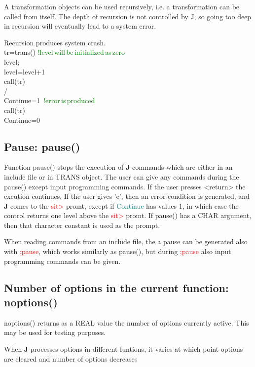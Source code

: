 \begin{note}
A transformation objects can be used recursively, i.e. a transformation can be called from
itself. The depth of recursion is not controlled by J, so going too deep in recursion will
eventually lead to a system error.
\end{note}
\begin{example}[recursion]Recursion produces system crash.\\
\label{recursion}
tr=\textcolor{VioletRed}{trans}() \textcolor{green}{!level\,will\,be\,initialized\,as\,zero}\\
level;\\
level=level+1\\
\textcolor{VioletRed}{call}(tr)\\
/\\
Continue=1 \,\textcolor{green}{!error\,is\,produced}\\
\textcolor{VioletRed}{call}(tr)\\
Continue=0
\end{example}
\subsection{Pause: \textcolor{VioletRed}{pause}()}
\label{pause}
Function \textcolor{VioletRed}{pause}() stops the execution of \textbf{J} commands which are either in an
include file or in TRANS object. The user can give any commands during the
\textcolor{VioletRed}{pause}() except input programming commands.
If the user presses <return> the excution continues. If the user gives 'e', then
an error condition is generated, and \textbf{J} comes to the \textcolor{Red}{sit>} promt, except
if \textcolor{teal}{Continue} has values 1, in which case the control returns one level above
the \textcolor{Red}{sit>} promt.
If \textcolor{VioletRed}{pause}()  has a CHAR argument, then that character constant is used as
the prompt.
\begin{note}
When reading commands from an include file, the a pause can be generated also
with \textcolor{Red}{;pause}, which works similarly as \textcolor{VioletRed}{pause}(), but during \textcolor{Red}{;pause} also input programming
commands can be given.
\end{note}
\subsection{Number of options in the current function: \textcolor{VioletRed}{noptions}()}
\label{noptions}
\textcolor{VioletRed}{noptions}() returns as a REAL value the number of options currently
active. This may be used for testing purposes.
\begin{note}
When \textbf{J} processes options in different funtions, it varies at which point
options are cleared and number of options decreases
\end{note}
